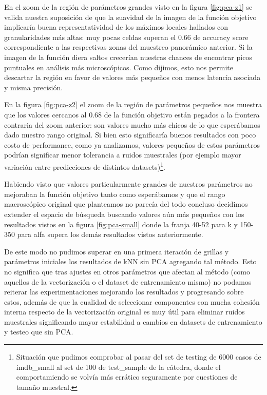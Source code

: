 En el zoom de la región de parámetros grandes visto en la figura
\ref{fig:pca-z1} se valida nuestra suposición de que la suavidad de la
imagen de la función objetivo implicaría buena representatividad de
los máximos locales hallados con granularidades más altas: muy pocas
celdas superan el $0.66$ de accuracy score correspondiente a las
respectivas zonas del muestreo panorámico anterior. Si la imagen de la
función diera saltos crecerían nuestras chances de encontrar picos
puntuales en análisis más microscópicos. Como dijimos, esto nos
permite descartar la región en favor de valores más pequeños con menos
latencia asociada y misma precisión.

En la figura \ref{fig:pca-z2} el zoom de la región de parámetros
pequeños nos muestra que los valores cercanos al 0.68 de la función
objetivo están pegados a la frontera contraria del zoom anterior: son
valores mucho más chicos de lo que esperábamos dado nuestro rango
original. Si bien esto significaría buenos resultados con poco costo
de performance, como ya analizamos, valores pequeños de estos
parámetros podrían significar menor tolerancia a ruidos muestrales
(por ejemplo mayor variación entre predicciones de distintos
datasets)\footnote{Situación que pudimos comprobar al pasar del set de
  testing de 6000 casos de imdb\_small al set de 100 de test\_sample
  de la cátedra, donde el comportamiendo se volvía más errático
  seguramente por cuestiones de tamaño muestral.}.

Habiendo visto que valores particularmente grandes de nuestros
parámetros no mejoraban la función objetivo tanto como esperábamos y
que el rango macroscópico original que planteamos no parecía del todo
concluso decidimos extender el espacio de búsqueda buscando valores
aún más pequeños con los resultados vistos en la figura
\ref{fig:pca-small} donde la franja 40-52 para k y 150-350 para alfa
supera los demás resultados vistos anteriormente.

De este modo no pudimos superar en una primera iteración de grillas y
parámetros iniciales los resultados de kNN sin PCA agregando tal
método. Esto no significa que tras ajustes en otros parámetros que
afectan al método (como aquellos de la vectorización o el dataset de
entrenamiento mismo) no podamos reiterar las experimentaciones
mejorando los resultados y progresando sobre estos, además de que la
cualidad de seleccionar componentes con mucha cohesión interna
respecto de la vectorización original es muy útil para eliminar ruidos
muestrales significando mayor estabilidad a cambios en datasets de
entrenamiento y testeo que sin PCA.

